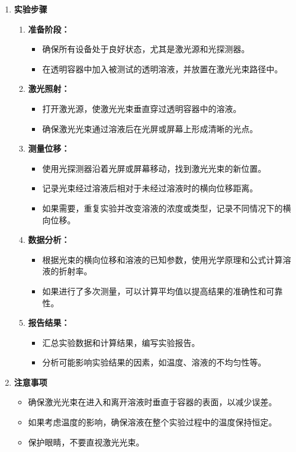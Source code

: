 \documentclass[dvipsnames, svgnames,a4paper,11pt]{article}
\begin{document}
\begin{enumerate}
\begin{enumerate}
			\item \textbf{实验步骤}
			\begin{enumerate}
				\item \textbf{准备阶段：}
				\begin{itemize}
					\item 确保所有设备处于良好状态，尤其是激光源和光探测器。
					\item 在透明容器中加入被测试的透明溶液，并放置在激光光束路径中。
				\end{itemize}
				
				\item \textbf{激光照射：}
				\begin{itemize}
					\item 打开激光源，使激光光束垂直穿过透明容器中的溶液。
					\item 确保激光光束通过溶液后在光屏或屏幕上形成清晰的光点。
				\end{itemize}
				
				\item \textbf{测量位移：}
				\begin{itemize}
					\item 使用光探测器沿着光屏或屏幕移动，找到激光光束的新位置。
					\item 记录光束经过溶液后相对于未经过溶液时的横向位移距离。
					\item 如果需要，重复实验并改变溶液的浓度或类型，记录不同情况下的横向位移。
				\end{itemize}
				
				\item \textbf{数据分析：}
				\begin{itemize}
					\item 根据光束的横向位移和溶液的已知参数，使用光学原理和公式计算溶液的折射率。
					\item 如果进行了多次测量，可以计算平均值以提高结果的准确性和可靠性。
				\end{itemize}
				
				\item \textbf{报告结果：}
				\begin{itemize}
					\item 汇总实验数据和计算结果，编写实验报告。
					\item 分析可能影响实验结果的因素，如温度、溶液的不均匀性等。
				\end{itemize}
			\end{enumerate}
			
			\item \textbf{注意事项}
			\begin{itemize}
				\item 确保激光光束在进入和离开溶液时垂直于容器的表面，以减少误差。
				\item 如果考虑温度的影响，确保溶液在整个实验过程中的温度保持恒定。
				\item 保护眼睛，不要直视激光光束。
			\end{itemize}
			
		\end{enumerate}
	\end{enumerate}
	
\end{document}
